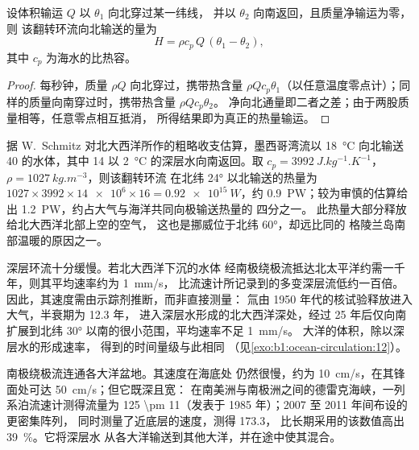 \begin{proposition}[翻转环流输送的热量]\label{prop:b1:ocean-circulation:heat}
设体积输运 $Q$ 以 $\theta_1$ 向北穿过某一纬线，
并以 $\theta_2$ 向南返回，且质量净输运为零，则
该翻转环流向北输送的量为
\[
  H = \rho c_p\,Q\,(\theta_1 - \theta_2),
\]
其中 $c_p$ 为海水的比热容。
\end{proposition}

\begin{proof}
每秒钟，质量 $\rho Q$ 向北穿过，携带热含量 $\rho Q
c_p\theta_1$（以任意温度零点计）；同样的质量向南穿过时，携带热含量
$\rho Q c_p\theta_2$。
净向北通量即二者之差；由于两股质量相等，任意零点相互抵消，
所得结果即为真正的热量输运。
\end{proof}

据 W.~Schmitz 对北大西洋所作的粗略收支估算，墨西哥湾流以 \qty{18}{\celsius} 向北输送
\qty{40}{\sverdrup} 的水体，其中
\qty{14}{\sverdrup} 以 \qty{2}{\celsius} 的深层水向南返回。取 $c_p =
\qty{3992}{J.kg^{-1}.K^{-1}}$，$\rho = \qty{1027}{kg.m^{-3}}$，则该翻转环流
在北纬 \ang{24} 以北输送的热量为 $1027 \times 3992 \times \num{14e6} \times 16 = \qty{0.92e15}{W}$，约
\qty{0.9}{PW}；较为审慎的估算给出 \qty{1.2}{PW}，约占大气与海洋共同向极输送热量的
四分之一。
此热量大部分释放给北大西洋北部上空的空气，
这也是挪威位于北纬 \ang{60}，却远比同的
格陵兰岛南部温暖的原因之一。

深层环流十分缓慢。若北大西洋下沉的水体
经南极绕极流抵达北太平洋约需一千年，则其平均速率约为 \qty{1}{mm/s}，
比流速计所记录到的多变深层流低约一百倍。
因此，其速度需由示踪剂推断，而非直接测量：
氚由 1950 年代的核试验释放进入大气，半衰期为 12.3 年，
进入深层水形成的北大西洋深处，经过 25 年后仅向南
扩展到北纬 \ang{30} 以南的很小范围，平均速率不足 \qty{1}{mm/s}。
大洋的体积，除以深层水的形成速率，
得到的时间量级与此相同
（见\cref{exo:b1:ocean-circulation:12}）。

南极绕极流连通各大洋盆地。其速度在海底处
仍然很慢，约为 \qty{10}{cm/s}，在其锋面处可达 \qty{50}{cm/s}；但它既深且宽：
在南美洲与南极洲之间的德雷克海峡，一列系泊流速计测得流量为
\qty[uncertainty-mode=separate]{125 \pm
11}{\sverdrup}（发表于 1985 年）；2007 至 2011 年间布设的更密集阵列，
同时测量了近底层的速度，测得 \qty{173.3}{\sverdrup}，
比长期采用的该数值高出 \qty{39}{\percent}。它将深层水
从各大洋输送到其他大洋，并在途中使其混合。

